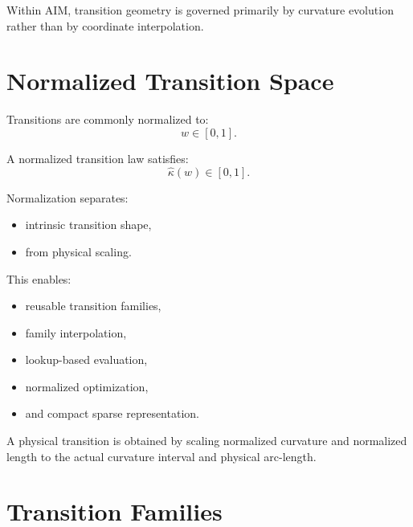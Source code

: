 \begin{principle}
\label{princ:transition-principle}
Within AIM, transition geometry is governed primarily by curvature
evolution rather than by coordinate interpolation.
\end{principle}

\section{Normalized Transition Space}

\begin{definition}
\label{def:normalized-transition-parameter}
Transitions are commonly normalized to:
\[
w\in[0,1].
\]
\end{definition}

\begin{definition}
\label{def:normalized-transition-law}
A normalized transition law satisfies:
\[
\hat\kappa(w)\in[0,1].
\]
\end{definition}

Normalization separates:
\begin{itemize}
\item intrinsic transition shape,
\item from physical scaling.
\end{itemize}

This enables:
\begin{itemize}
\item reusable transition families,
\item family interpolation,
\item lookup-based evaluation,
\item normalized optimization,
\item and compact sparse representation.
\end{itemize}

A physical transition is obtained by scaling normalized curvature and
normalized length to the actual curvature interval and physical
arc-length.

\section{Transition Families}

